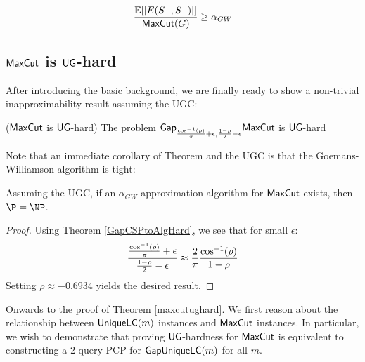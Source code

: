 \begin{equation}
  \frac{\mathbb{E}[|E(S_+,S_-)|]}{\mathsf{MaxCut}(G)} \geq \alpha_{GW}
\end{equation}

\subsection{$\mathsf{MaxCut}$ is $\mathsf{UG}$-hard}
After introducing the basic background, we are finally ready to show a non-trivial inapproximability result assuming the UGC:

\begin{theorem} \label{maxcutughard} ($\mathsf{MaxCut}$ is $\mathsf{UG}$-hard) The problem $\mathsf{Gap}_{\frac{\cos^{-1}(\rho)}{\pi} + \epsilon, \frac{1-\rho}{2} - \epsilon}\mathsf{MaxCut}$ is $\mathsf{UG}$-hard
\end{theorem}
Note that an immediate corollary of Theorem and the UGC is that the Goemans-Williamson algorithm is tight:

\begin{corollary}
Assuming the UGC, if an $\alpha_{GW}$-approximation algorithm for $\mathsf{MaxCut}$ exists, then $\P = \NP$.
\end{corollary}
%
\begin{proof}
Using Theorem \ref{GapCSPtoAlgHard}, we see that for small $\epsilon$:
\[ \frac{\frac{\cos^{-1}(\rho)}{\pi} + \epsilon}{\frac{1-\rho}{2} - \epsilon} \approx \frac{2}{\pi}\frac{\cos^{-1}(\rho)}{1 - \rho} \]
Setting $\rho \approx -0.6934$ yields the desired result.
\end{proof}

Onwards to the proof of Theorem \ref{maxcutughard}. We first reason about the relationship between $\mathsf{UniqueLC}(m)$ instances and $\mathsf{MaxCut}$ instances. In particular, we wish to demonstrate that proving $\mathsf{UG}$-hardness for $\mathsf{MaxCut}$ is equivalent to constructing a $2$-query PCP for $\mathsf{GapUniqueLC}(m)$ for all $m$.

